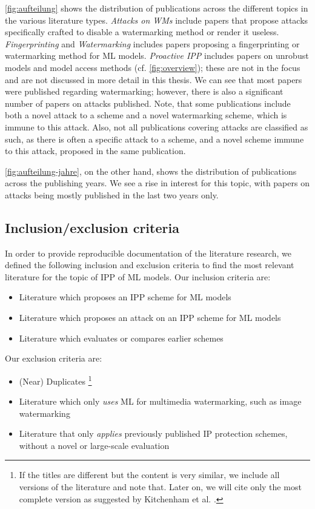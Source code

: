\cref{fig:aufteilung} shows the distribution of publications across the different topics in the various literature types. \textit{Attacks on WMs} include papers that propose attacks specifically crafted to disable a watermarking method or render it useless. \textit{Fingerprinting} and \textit{Watermarking} includes papers proposing a fingerprinting or watermarking method for ML models. \textit{Proactive IPP} includes papers on unrobust models and model access methods (cf. \cref{fig:overview}); these are not in the focus and are not discussed in more detail in this thesis. We can see that most papers were published regarding watermarking; however, there is also a significant number of papers on attacks published. Note, that some publications include both a novel attack to a scheme and a novel watermarking scheme, which is immune to this attack. Also, not all publications covering attacks are classified as such, as there is often a specific attack to a scheme, and a novel scheme immune to this attack, proposed in the same publication.

\cref{fig:aufteilung-jahre}, on the other hand, shows the distribution of publications across the publishing years. We see a rise in interest for this topic, with papers on attacks being mostly published in the last two years only.

\subsection{Inclusion/exclusion criteria} \label{appendix:method:criteria}

In order to provide reproducible documentation of the literature research, we defined the following inclusion and exclusion criteria to find the most relevant literature for the topic of IPP of ML models. Our inclusion criteria are:
\begin{itemize}
    \item Literature which proposes an IPP scheme for ML models
    \item Literature which proposes an attack on an IPP scheme for ML models
    \item Literature which evaluates or compares earlier schemes
\end{itemize}

Our exclusion criteria are:
\begin{itemize}
    \item (Near) Duplicates \footnote{If the titles are different but the content is very similar, we include all versions of the literature and note that. Later on, we will cite only the most complete version as suggested by Kitchenham et al. \cite{kitchenham_guidelines_2007}.}
    \item Literature which only \textit{uses} ML for multimedia watermarking, such as image watermarking
    \item Literature that only \textit{applies} previously published IP protection schemes, without a novel or large-scale evaluation
\end{itemize}

